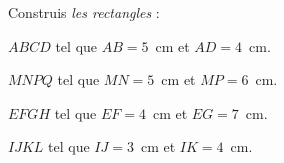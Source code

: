 \par Construis {\em les rectangles} :
\begin{myenumerate}
\item $ABCD$ tel que $AB=5$~cm et $AD=4$~cm.
\item $MNPQ$ tel que $MN=5$~cm et $MP=6$~cm.
\item $EFGH$ tel que $EF=4$~cm et $EG=7$~cm.
\item $IJKL$ tel que $IJ=3$~cm et $IK=4$~cm.
\end{myenumerate}